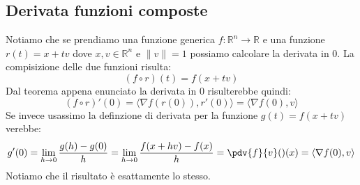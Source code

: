 \subsection{Derivata funzioni composte}
Notiamo che se prendiamo una funzione generica $f: \mathbb{R}^n \to \mathbb{R}$ e una funzione $r(t) = x + tv$ dove $x, v \in \mathbb{R}^n$ e $\lVert v \rVert = 1$ possiamo calcolare la derivata in 0. La compisizione delle due funzioni risulta:
\begin{equation*}
	(f \circ r)(t) = f(x + tv) 
\end{equation*}
Dal teorema appena enunciato la derivata in 0 risulterebbe quindi:
\begin{equation*}
	(f \circ r)'(0) = \langle \nabla f(r(0)), r'(0) \rangle = \langle \nabla f(0), v \rangle 
\end{equation*}
Se invece usassimo la definzione di derivata per la funzione $g(t) = f(x + tv)$ verebbe:
\begin{equation*}
	g'(0) = \lim_{h \to 0} \dfrac{g(h) - g(0)}{h} = \lim_{h \to 0} \dfrac{f(x + hv) - f(x)}{h} = \pdv{f}{v}() (x) = \langle \nabla f(0), v \rangle
\end{equation*}
Notiamo che il risultato è esattamente lo stesso.

